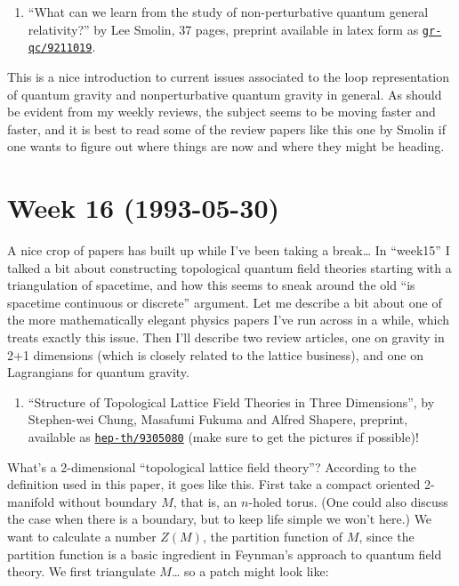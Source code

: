\documentclass{article}
\def\tightlist{}
\begin{document}
\begin{enumerate}
\def\labelenumi{\arabic{enumi})}
\setcounter{enumi}{2}
\tightlist
\item
  ``What can we learn from the study of non-perturbative quantum general
  relativity?'' by Lee Smolin, 37 pages, preprint available in latex
  form as
  \href{http://xxx.lanl.gov/abs/gr-qc/9211019}{\texttt{gr-qc/9211019}}.
\end{enumerate}

This is a nice introduction to current issues associated to the loop
representation of quantum gravity and nonperturbative quantum gravity in
general. As should be evident from my weekly reviews, the subject seems
to be moving faster and faster, and it is best to read some of the
review papers like this one by Smolin if one wants to figure out where
things are now and where they might be heading.
\hypertarget{week-16-1993-05-30}{%
\section{Week 16 (1993-05-30)}\label{week-16-1993-05-30}}

A nice crop of papers has built up while I've been taking a
break\ldots{} In ``week15'' I talked a bit about constructing
topological quantum field theories starting with a triangulation of
spacetime, and how this seems to sneak around the old ``is spacetime
continuous or discrete'' argument. Let me describe a bit about one of
the more mathematically elegant physics papers I've run across in a
while, which treats exactly this issue. Then I'll describe two review
articles, one on gravity in 2+1 dimensions (which is closely related to
the lattice business), and one on Lagrangians for quantum gravity.

\begin{enumerate}
\def\labelenumi{\arabic{enumi})}
\tightlist
\item
  ``Structure of Topological Lattice Field Theories in Three
  Dimensions'', by Stephen-wei Chung, Masafumi Fukuma and Alfred
  Shapere, preprint, available as
  \href{http://xxx.lanl.gov/abs/hep-th/9305080}{\texttt{hep-th/9305080}}
  (make sure to get the pictures if possible)!
\end{enumerate}

What's a 2-dimensional ``topological lattice field theory''? According
to the definition used in this paper, it goes like this. First take a
compact oriented 2-manifold without boundary \(M\), that is, an
\(n\)-holed torus. (One could also discuss the case when there is a
boundary, but to keep life simple we won't here.) We want to calculate a
number \(Z(M)\), the partition function of \(M\), since the partition
function is a basic ingredient in Feynman's approach to quantum field
theory. We first triangulate \(M\)\ldots{} so a patch might look like:
\end{document}

